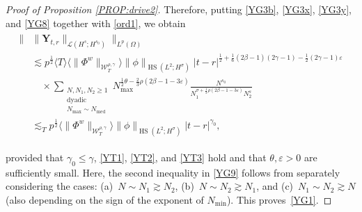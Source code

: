 \documentclass[letterpaper, 11pt,  reqno]{amsart}
\DeclareMathOperator{\med}{med}
\DeclareMathOperator{\HS}{HS}
\newcommand{\1}{\hspace{0.5mm}\textup{I}\hspace{0.5mm}}
\newcommand{\noi}{\noindent}
\newcommand{\be}{\beta}
\newcommand{\eps}{\varepsilon}
\newcommand{\g}{\gamma}
\newcommand{\s}{\sigma}
\newcommand{\ta}{\theta}
\newcommand{\les}{\lesssim}
\newcommand{\ges}{\gtrsim}
\newcommand{\jb}[1]
{\langle #1 \rangle}
\newcommand{\W}{\mathcal{W}}
\newcommand{\Om}{\Omega}
\newcommand{\LOP}{\mathcal{L}}
\newcommand{\YY}{\mathbf{Y}}
\numberwithin{equation}{section}
\numberwithin{theorem}{section}
\begin{document}
\begin{proof}[Proof of Proposition \ref{PROP:drive2}]
Therefore, putting 
\eqref{YG3b}, \eqref{YG3x}, \eqref{YG3y}, 
and \eqref{YG8} together with \eqref{ord1}, we obtain
\begin{align}
\begin{split}
  \big\|  &  \| \YY_{t,r} \|_{\LOP(H^s;H^{s_0})} \big\|_{L^p(\Om)}\\
& \les 
p^\frac 12 
\jb{T} 
\jb{\|\Phi^w\|_{  \W^{\rho,\g}_T} }
\|\phi\|_{\HS(L^2; H^\s)}
 |t- r|^{\frac 12 + \frac 16 (2\be - 1)(2\g-1) - \frac 12  (2\g-1)\eps}\\
& \quad \times \sum_{\substack{N, N_1, N_2 \ge1 \\\text{dyadic}\\
N_{\max}\sim N_{\med}}}  
N_{\max}^{\frac 12 \ta
- \frac 23\rho (2 \be - 1 -3\eps)}
\frac{N^{s_0}}{N_1^{\s+ \frac 13\rho (2 \be - 1-3\eps)} N_2^{s}}\\
& \les_T 
p^\frac 12 
\jb{\|\Phi^w\|_{  \W^{\rho,\g}_T} }
\|\phi\|_{\HS(L^2; H^\s)}
 |t- r|^{\g_0}, 
\end{split}
\label{YG9}
\end{align}

\noi
provided that 
$\g_0 \le \g$, 
\eqref{YT1}, 
\eqref{YT2},  and \eqref{YT3} 
hold
and that $\ta, \eps > 0$ are sufficiently small.
Here, the second inequality in \eqref{YG9} follows
from separately considering the cases:
 (a)~$N \sim N_1 \ges N_2$, 
(b)~$N \sim N_2 \ges N_1$, 
and 
(c)~$N_1 \sim N_2 \ges N$
(also depending on the sign of the exponent of $N_{\min}$).
This proves~\eqref{YG1}.
\end{proof}
\end{document}
